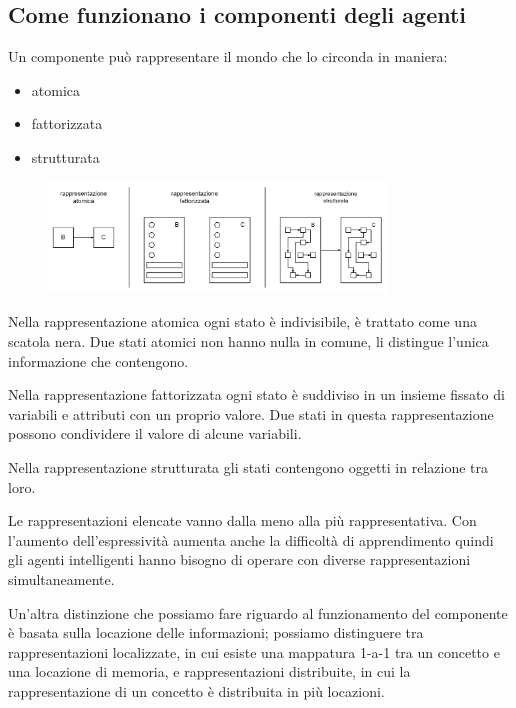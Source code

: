 \subsection{Come funzionano i componenti degli agenti}

Un componente può rappresentare il mondo che lo circonda in maniera:

\begin{itemize}
	\item atomica
	\item fattorizzata
	\item strutturata
\end{itemize}

\begin{figure}[H]
	\centering
	\includegraphics[width=0.8\textwidth]{capitoli/agenti-intelligenti/imgs/componenti.png}
\end{figure}

Nella rappresentazione atomica ogni stato è indivisibile, è trattato come una scatola nera. Due stati atomici non hanno nulla in comune, li distingue l'unica informazione che contengono.

Nella rappresentazione fattorizzata ogni stato è suddiviso in un insieme fissato di variabili e attributi con un proprio valore. Due stati in questa rappresentazione possono condividere il valore di alcune variabili.

Nella rappresentazione strutturata gli stati contengono oggetti in relazione tra loro.

Le rappresentazioni elencate vanno dalla meno alla più rappresentativa. 
Con l'aumento dell'espressività aumenta anche la difficoltà di apprendimento 
quindi gli agenti intelligenti hanno bisogno di operare con diverse 
rappresentazioni simultaneamente.

Un'altra distinzione che possiamo fare riguardo al funzionamento del componente è basata sulla locazione delle informazioni; possiamo distinguere tra rappresentazioni localizzate, in cui esiste una mappatura 1-a-1 tra un concetto e una locazione di memoria, e rappresentazioni distribuite, in cui la rappresentazione di un concetto è distribuita in più locazioni.